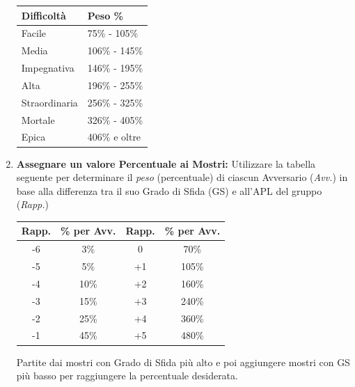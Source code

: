 \begin{multicols}{2}
\begin{enumerate}[leftmargin=*]
\medskip

\noindent\begin{tabularx}{\linewidth}{lX}
	\toprule
\rowcolor{gray!20}\textbf{Difficoltà} & \textbf{Peso \%}\\
\toprule
	Facile 		& 75\% - 105\%\\
 \rowcolor{gray!20}Media		& 106\% - 145\%\\
	Impegnativa	& 146\% - 195\%\\
 \rowcolor{gray!20}Alta		& 196\% - 255\%\\
Straordinaria	& 256\% - 325\%\\
 \rowcolor{gray!20}Mortale		& 326\% - 405\%\\
	Epica		& 406\% e oltre\\
\end{tabularx}


\item \textbf{Assegnare un valore Percentuale ai Mostri:} Utilizzare la tabella seguente per determinare il \emph{peso} (percentuale) di ciascun Avversario (\emph{Avv.}) in base alla differenza tra il suo Grado di Sfida (GS) e all'APL del gruppo (\emph{Rapp.})

\medskip

\noindent\begin{tabularx}{\linewidth}{c|c|c|c}
	\toprule
\rowcolor{gray!20}\textbf{Rapp.} & \textbf{\% per Avv.} &\textbf{Rapp.} & \textbf{\% per Avv.}\\
\toprule
-6 & 3\% &  0 & 70\% \\
\rowcolor{gray!20}-5 & 5\% & +1 & 105\% \\
-4 & 10\% & +2 & 160\% \\
\rowcolor{gray!20}-3 & 15\% & +3 & 240\% \\
-2 & 25\% & +4 & 360\% \\
\rowcolor{gray!20}-1 & 45\% & +5 & 480\% \\
\end{tabularx}

\medskip

Partite dai mostri con Grado di Sfida più alto e poi aggiungere mostri con GS più basso per raggiungere la percentuale desiderata.

\end{enumerate}



\end{multicols}
